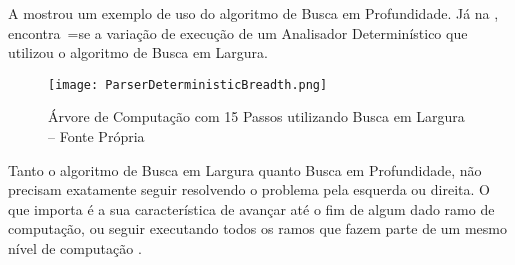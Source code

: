 A  mostrou um exemplo de uso do algoritmo de Busca em Profundidade.
Já na ,
encontra~=se a variação de execução de um Analisador Determinístico que utilizou o algoritmo de Busca em Largura.
\begin{figure}[h]
\centering
\texttt{[image: ParserDeterministicBreadth.png]}
\caption[Árvore de Computação com 15 Passos utilizando Busca em Largura]{Árvore de Computação com 15 Passos\protect\footnotemark{} utilizando Busca em Largura -- Fonte Própria}
\label{ParserDeterministicBreadth}
\end{figure}

Tanto o algoritmo de Busca em Largura quanto Busca em Profundidade,
não precisam exatamente seguir resolvendo o problema pela esquerda ou
direita.
O que importa é a sua característica de avançar até o fim de algum dado ramo de computação,
ou seguir executando todos os ramos que fazem parte de um mesmo nível de computação \cite{cormenIntroductionToAlgorithms,efficientBreadthFirstSearch}.

